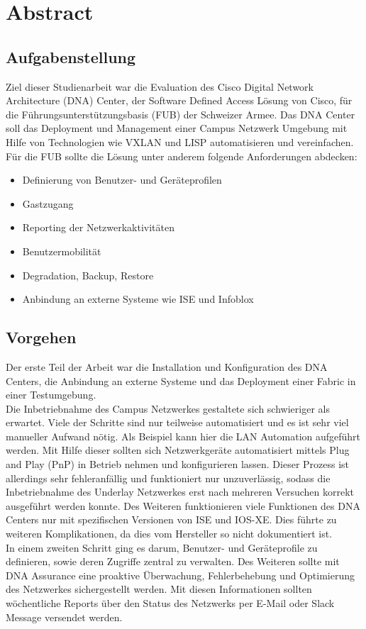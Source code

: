 \section{Abstract}

\subsection{Aufgabenstellung}

Ziel dieser Studienarbeit war die Evaluation des Cisco Digital Network Architecture (DNA) Center, der Software Defined Access Lösung von Cisco, für die Führungsunterstützungsbasis (FUB) der Schweizer Armee. Das DNA Center soll das Deployment und Management einer Campus Netzwerk Umgebung mit Hilfe von Technologien wie VXLAN und LISP automatisieren und vereinfachen.\\
Für die FUB sollte die Lösung unter anderem folgende Anforderungen abdecken:
\begin{itemize}
	\item Definierung von Benutzer- und Geräteprofilen
	\item Gastzugang
	\item Reporting der Netzwerkaktivitäten
	\item Benutzermobilität
	\item Degradation, Backup, Restore
	\item Anbindung an externe Systeme wie ISE und Infoblox
\end{itemize}

\subsection{Vorgehen}
Der erste Teil der Arbeit war die Installation und Konfiguration des DNA Centers, die Anbindung an externe Systeme und das Deployment einer Fabric in einer Testumgebung.\\
Die Inbetriebnahme des Campus Netzwerkes gestaltete sich schwieriger als erwartet. Viele der Schritte sind nur teilweise automatisiert und es ist sehr viel manueller Aufwand nötig. Als Beispiel kann hier die LAN Automation aufgeführt werden. Mit Hilfe dieser sollten sich Netzwerkgeräte automatisiert mittels Plug and Play (PnP) in Betrieb nehmen und konfigurieren lassen. Dieser Prozess ist allerdings sehr fehleranfällig und funktioniert nur unzuverlässig, sodass die Inbetriebnahme des Underlay Netzwerkes erst nach mehreren Versuchen korrekt ausgeführt werden konnte. 
Des Weiteren funktionieren viele Funktionen des DNA Centers nur mit spezifischen Versionen von ISE und IOS-XE. Dies führte zu weiteren Komplikationen, da dies vom Hersteller so nicht dokumentiert ist. \\
In einem zweiten Schritt ging es darum, Benutzer- und Geräteprofile zu definieren, sowie deren Zugriffe zentral zu verwalten. Des Weiteren sollte mit DNA Assurance eine proaktive Überwachung, Fehlerbehebung und Optimierung des Netzwerkes sichergestellt werden. Mit diesen Informationen sollten wöchentliche Reports über den Status des Netzwerks per E-Mail oder Slack Message versendet werden.
